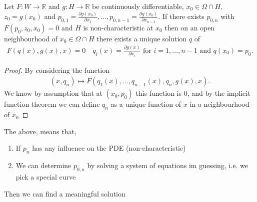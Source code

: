 \begin{Lemma}[1.7]
 Let $F : W \to \mathbb{R}$ and $g : H \to \mathbb{R}$  be continuously differentiable, $x_{0} \in  \Omega  \cap H$,
 $z_{0} = g(x_{0})$ and $p_{0,1}=\frac{\partial g(x_{0})}{\partial x_{1}},\ldots ,p_{0,n-1} =\frac{\partial g(x_{0})}{\partial x_{n-1}}$. If
 there exists $p_{0,n}$ with $F(p_{0},z_{0},x_{0}) = 0$ and $H$ is non-characteristic at $x_{0}$ then on an open neighbourhood of $x_{0} \in  \Omega  \cap H$ there exists a unique solution $q$ of 
 \begin{align*}
  F(q(x),g(x),x) = 0 \quad q_i(x) = \frac{\partial g(x )}{\partial x_i}  \text{ for } i = 1,\ldots ,n-1 \text{ and } q(x_{0}) = p_{0}
 .\end{align*}
\end{Lemma}
\begin{proof}
 By considering the function 
 \begin{align*}
   (x,q_n) \mapsto F(q_{1}(x),\ldots ,q_{n-1}(x),q_n,g(x),x)
 .\end{align*}
 We know by assumption that  at $(x_{0},p_{0})$ this function is 0, and by the implicit function theorem we can define $q_n$ as a unique function of $x$ in a neighbourhood of $x_{0}$
\end{proof}
\begin{note}
 The above, means that, 
 \begin{enumerate}
  \item If $p_n$ has any influence on the PDE (non-characteristic) 
  \item We can determine $p_{0,n}$ by solving a system of equations im guessing, i.e. we pick a special curve
 \end{enumerate}
 Then we can find a meaningful solution 
\end{note}
